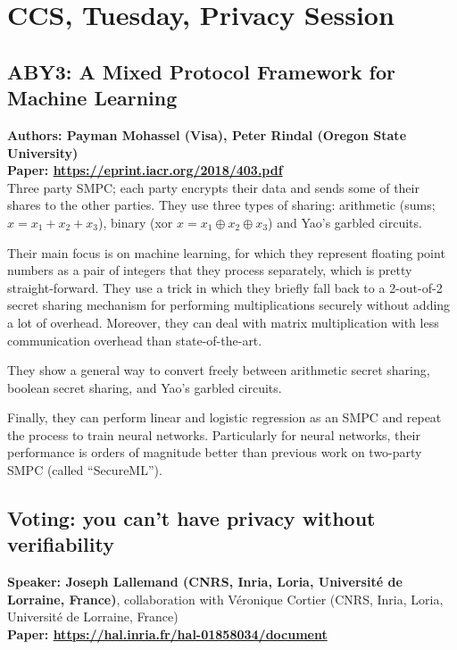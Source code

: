 \documentclass{article}
\begin{document}
\section{CCS, Tuesday, Privacy Session}

\subsection{ABY3: A Mixed Protocol Framework for Machine Learning}
\noindent\textbf{Authors: Payman Mohassel (Visa), Peter Rindal (Oregon State University)}\\
\noindent\textbf{Paper: \url{https://eprint.iacr.org/2018/403.pdf}}\\

Three party SMPC; each party encrypts their data and sends some of their shares to the other parties. 
They use three types of sharing: arithmetic (sums; $x = x_1 + x_2 + x_3$), binary (xor $x = x_1 \oplus x_2 \oplus x_3$) and Yao's garbled circuits.


Their main focus is on machine learning, for which they represent floating point numbers as a pair of integers that they process separately, which is pretty straight-forward.
They use a trick in which they briefly fall back to a 2-out-of-2 secret sharing mechanism for performing multiplications securely without adding a lot of overhead. Moreover, they can deal with matrix multiplication with less communication overhead than state-of-the-art.

They show a general way to convert freely between arithmetic secret sharing, boolean secret sharing, and Yao's garbled circuits.

Finally, they can perform linear and logistic regression as an SMPC and repeat the process to train neural networks. Particularly for neural networks, their performance is orders of magnitude better than previous work on two-party SMPC (called ``SecureML'').

\subsection{Voting: you can’t have privacy without verifiability}
\noindent\textbf{Speaker: Joseph Lallemand (CNRS, Inria, Loria, Université de Lorraine, France)}, collaboration with Véronique Cortier (CNRS, Inria, Loria, Université de Lorraine, France)\\
\noindent\textbf{Paper: \url{https://hal.inria.fr/hal-01858034/document}}\\
\end{document}

